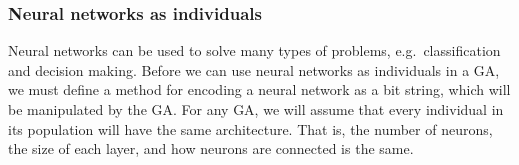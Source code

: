 \subsubsection{Neural networks as individuals}

Neural networks can be used to solve many types of problems, e.g.\ classification and decision making.
Before we can use neural networks as individuals in a GA, we must define a method for encoding a neural network as a bit string, which will be manipulated by the GA\@. For any GA, we will assume that every individual in its population will have the same architecture. That is, the number of neurons, the size of each layer, and how neurons are connected is the same.



